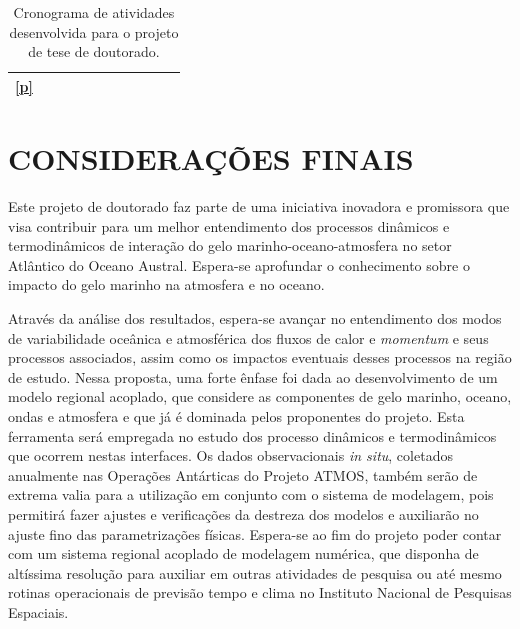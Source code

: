 \documentclass{article}
\begin{document}
\begin{table}[H]
\begin{tabular}{|c|c|c|c|c|c|c|c|c|c|c|}
	\textbf{\ref{p}}                     & \cellcolor{bleu_cite}                                               & \cellcolor{bleu_cite}                                               &  \cellcolor{bleu_cite}                                             & \cellcolor{bleu_cite}                                              & \cellcolor{bleu_cite}                                               & \multicolumn{1}{l|}{\cellcolor{bleu_cite} }                        & \multicolumn{1}{l|}{\cellcolor{bleu_cite}}                        & \multicolumn{1}{l|}{\cellcolor{bleu_cite}}                           \\ \hline
	
\end{tabular}
\caption{Cronograma de atividades desenvolvida para o projeto de tese de doutorado.}
\label{cronos}
	\end{table}

\section{CONSIDERAÇÕES FINAIS}
\bigskip

Este projeto de doutorado faz parte de uma iniciativa inovadora e promissora que visa contribuir para um  
melhor entendimento dos processos dinâmicos e termodinâmicos de interação do gelo marinho-oceano-atmosfera  
no setor Atlântico do Oceano Austral. Espera-se aprofundar o conhecimento sobre o impacto do gelo marinho na atmosfera
e no oceano.

Através da análise dos resultados, espera-se avançar no entendimento dos modos de variabilidade oceânica e 
atmosférica dos fluxos de calor e \textit{momentum} e seus processos associados, assim como os impactos eventuais desses processos 
na região de estudo. Nessa proposta, uma forte ênfase foi dada ao desenvolvimento de um modelo regional acoplado, 
que considere as componentes de gelo marinho, oceano, ondas e atmosfera e que já é dominada pelos proponentes do projeto.
Esta ferramenta será empregada no estudo dos processo dinâmicos e termodinâmicos que ocorrem nestas interfaces. Os dados 
observacionais \textit{in  situ}, coletados anualmente nas Operações Antárticas do Projeto ATMOS, também serão de extrema  
valia para a utilização em conjunto com o sistema de modelagem, pois permitirá fazer ajustes e verificações da destreza dos
modelos e auxiliarão no ajuste fino das parametrizações físicas. Espera-se ao fim do projeto poder contar com um sistema 
regional acoplado de modelagem numérica, que disponha de altíssima resolução para auxiliar em outras atividades de pesquisa 
ou até mesmo rotinas operacionais de previsão tempo e clima no Instituto Nacional de Pesquisas Espaciais. 
\end{document}
